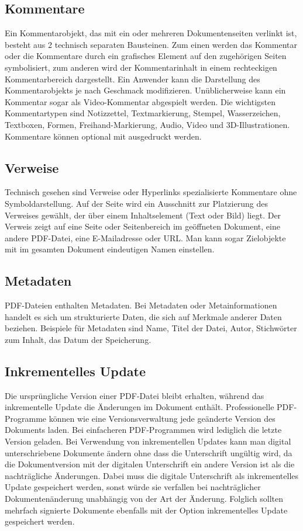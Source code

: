 \subsection{Kommentare}
Ein Kommentarobjekt, das mit ein oder mehreren Dokumentenseiten verlinkt ist, besteht aus 2 technisch separaten Bausteinen. Zum einen werden das Kommentar oder die Kommentare durch ein grafisches Element auf den zugehörigen Seiten symbolisiert, zum anderen wird der Kommentarinhalt in einem rechteckigen Kommentarbereich dargestellt. Ein Anwender kann die Darstellung des Kommentarobjekts je nach Geschmack modifizieren. Unüblicherweise kann ein Kommentar sogar als Video-Kommentar abgespielt werden. Die wichtigsten Kommentartypen sind Notizzettel, Textmarkierung, Stempel, Wasserzeichen, Textboxen, Formen, Freihand-Markierung, Audio, Video und 3D-Illustrationen. Kommentare können optional mit ausgedruckt werden. \cite{softx}

\subsection{Verweise}
Technisch gesehen sind Verweise oder Hyperlinks spezialisierte Kommentare ohne Symboldarstellung. Auf der Seite wird ein Ausschnitt zur Platzierung des Verweises gewählt, der über einem Inhaltselement (Text oder Bild) liegt. Der Verweis zeigt auf eine Seite oder Seitenbereich im geöffneten Dokument, eine andere PDF-Datei, eine E-Mailadresse oder URL. Man kann sogar Zielobjekte mit im gesamten Dokument eindeutigen Namen einstellen. \cite{softx}

\subsection{Metadaten}
PDF-Dateien enthalten Metadaten. Bei Metadaten oder Metainformationen handelt es sich um strukturierte Daten, die sich auf Merkmale anderer Daten beziehen. Beispiele für Metadaten sind Name, Titel der Datei, Autor, Stichwörter zum Inhalt, das Datum der Speicherung.

\subsection{Inkrementelles Update}
Die ursprüngliche Version einer PDF-Datei bleibt erhalten, während das inkrementelle Update die Änderungen im Dokument enthält. Professionelle PDF-Programme können wie eine Versionsverwaltung jede geänderte Version des Dokuments laden. Bei einfacheren PDF-Programmen wird lediglich die letzte Version geladen. Bei Verwendung von inkrementellen Updates kann man digital unterschriebene Dokumente ändern ohne dass die Unterschrift ungültig wird, da die Dokumentversion mit der digitalen Unterschrift ein andere Version ist als die nachträgliche Änderungen. Dabei muss die digitale Unterschrift als inkrementelles Update gespeichert werden, sonst würde sie verfallen bei nachträglicher Dokumentenänderung unabhängig von der Art der Änderung. Folglich sollten mehrfach signierte Dokumente ebenfalls mit der Option inkrementelles Update gespeichert werden. \cite{softx}

